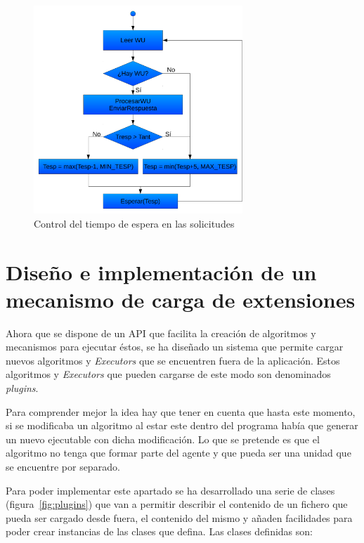 \begin{figure}
	\centering
	\includegraphics[width=0.7\textwidth]{images/control_tiempo_espera.pdf}
	\caption{Control del tiempo de espera en las solicitudes}\label{fig:control_tiempo_espera}
\end{figure}

\section{Diseño e implementación de un mecanismo de carga de extensiones}

Ahora que se dispone de un API que facilita la creación de algoritmos y mecanismos para ejecutar éstos, se ha diseñado un sistema que permite cargar nuevos algoritmos y \emph{Executors} que se encuentren fuera de la aplicación. Estos algoritmos y \emph{Executors} que pueden cargarse de este modo son denominados \emph{plugins}.

Para comprender mejor la idea hay que tener en cuenta que hasta este momento, si se modificaba un algoritmo al estar este dentro del programa había que generar un nuevo ejecutable con dicha modificación. Lo que se pretende es que el algoritmo no tenga que formar parte del agente y que pueda ser una unidad que se encuentre por separado.

Para poder implementar este apartado se ha desarrollado una serie de clases (figura~\ref{fig:plugins}) que van a permitir describir el contenido de un fichero que pueda ser cargado desde fuera, el contenido del mismo y añaden facilidades para poder crear instancias de las clases que defina. Las clases definidas son:

